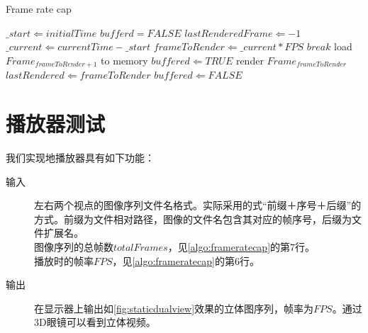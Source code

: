 \begin{algorithm}
\caption{Frame rate cap}
\label{algo:frameratecap}
\begin{algorithmic}[1]
	\STATE $\_start \Leftarrow initialTime$ %
	\STATE $bufferd = FALSE$
	\STATE $lastRenderedFrame \Leftarrow -1$
		\STATE $\_current \Leftarrow currentTime - \_start$ %
		\STATE $frameToRender \Leftarrow \_current * FPS$ %
			\STATE $break$ 
		\ENDIF
			\STATE load $Frame_{frameToRender+1}$ to memory
			\STATE $buffered \Leftarrow TRUE$
		\ENDIF
			\STATE render $Frame_{frameToRender}$
			\STATE $lastRendered \Leftarrow frameToRender$
			\STATE $buffered \Leftarrow FALSE$
		\ENDIF
	\ENDWHILE
\end{algorithmic}
\end{algorithm}

\section{播放器测试}
\label{sec:3dplayerdemo}

我们实现地播放器具有如下功能：
\begin{description}
\item[输入] 左右两个视点的图像序列文件名格式。实际采用的式“前缀＋序号＋后缀”的方式。前缀为文件相对路径，图像的文件名包含其对应的帧序号，后缀为文件扩展名。\\
	图像序列的总帧数$totalFrames$，见\autoref{algo:frameratecap}的第7行。\\
	播放时的帧率$FPS$，见\autoref{algo:frameratecap}的第6行。
\item[输出] 在显示器上输出如\autoref{fig:staticdualview}效果的立体图序列，帧率为$FPS$。通过3D眼镜可以看到立体视频。
\end{description}


